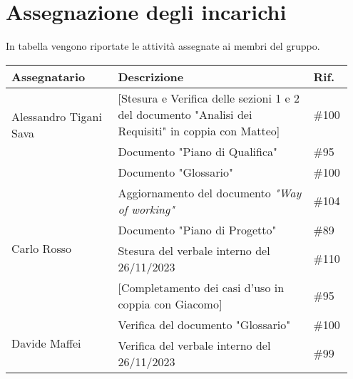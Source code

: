 \section{Assegnazione degli incarichi}
In tabella vengono riportate le attività assegnate ai membri del gruppo.
\begin{center}
	{
		\renewcommand{\arraystretch}{1.5}
		\begin{tabular}{p{0.30\linewidth}|p{0.55\linewidth}|p{0.10\linewidth}}
			\textbf{Assegnatario}                   & \textbf{Descrizione}                                                                                    & \textbf{Rif.} \\
			\hline
			\multirow{2}{*}{Alessandro Tigani Sava} & [Stesura e Verifica delle sezioni 1 e 2 del documento "Analisi dei Requisiti" in coppia con Matteo]     & \#100         \\
			\cline{2-3}
			                                        & Documento "Piano di Qualifica"                                                                          & \#95          \\
			\cline{2-3}
			                                        & Documento "Glossario"                                                                                   & \#100         \\
			\cline{2-3}
			                                        & Aggiornamento del documento \textit{"Way of working"}                                                   & \#104         \\
			\hline
			\multirow{2}{*}{Carlo Rosso}            & Documento "Piano di Progetto"                                                                           & \#89          \\
			\cline{2-3}
			                                        & Stesura del verbale interno del 26/11/2023                                                              & \#110         \\
			\cline{2-3}
			                                        & [Completamento dei casi d'uso in coppia con Giacomo]                                                    & \#95          \\
			\hline
			\multirow{2}{*}{Davide Maffei}          & Verifica del documento "Glossario"                                                                      & \#100         \\
			\cline{2-3}
			                                        & Verifica del verbale interno del 26/11/2023                                                             & \#99          \\

\end{tabular}}
\end{center}
